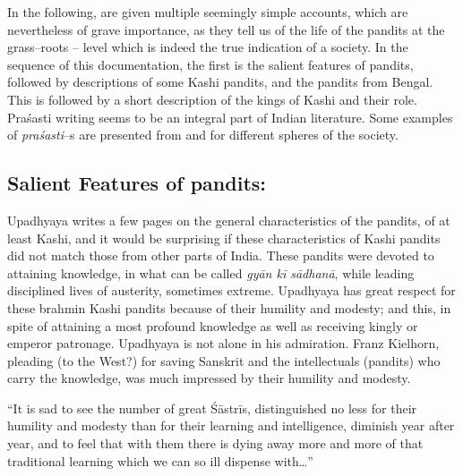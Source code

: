 In the following, are given multiple seemingly simple accounts, which are nevertheless of grave importance, as they tell us of the life of the pandits at the grass–roots – level which is indeed the true indication of a society. In the sequence of this documentation, the first is the salient features of pandits, followed by descriptions of some Kashi pandits, and the pandits from Bengal. This is followed by a short description of the kings of Kashi and their role. Praśasti writing seems to be an integral part of Indian literature. Some examples of \textit{praśasti}–s are presented from and for different spheres of the society.


\subsection*{Salient Features of pandits:}

Upadhyaya writes a few pages on the general characteristics of the pandits, of at least Kashi, and it would be surprising if these characteristics of Kashi pandits did not match those from other parts of India. These pandits were devoted to attaining knowledge, in what can be called \textit{gyān kī sādhanā}, while leading disciplined lives of austerity, sometimes extreme. Upadhyaya has great respect for these brahmin Kashi pandits because of their humility and modesty; and this, in spite of attaining a most profound knowledge as well as receiving kingly or emperor patronage. Upadhyaya is not alone in his admiration. Franz Kielhorn, pleading (to the West?) for saving Sanskrit and the intellectuals (pandits) who carry the knowledge, was much impressed by their humility and modesty.

\begin{myquote}
“It is sad to see the number of great Śāstrīs, distinguished no less for their humility and modesty than for their learning and intelligence, diminish year after year, and to feel that with them there is dying away more and more of that traditional learning which we can so ill dispense with…” 
\end{myquote}

